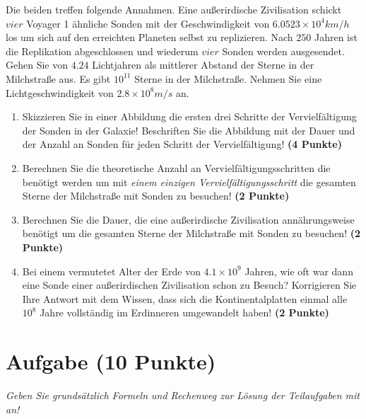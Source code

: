 \documentclass[a4paper, 9pt]{scrartcl}\usepackage[]{graphicx}\usepackage[]{xcolor}
\begin{document}
Die beiden treffen folgende Annahmen. Eine außerirdische Zivilisation schickt $vier$ Voyager 1 ähnliche Sonden mit der Geschwindigkeit von $\ensuremath{6.0523\times 10^{4}}km/h$ los um sich auf den erreichten Planeten selbst zu replizieren. Nach $250$ Jahren ist die Replikation abgeschlossen und wiederum $vier$ Sonden werden ausgesendet. Gehen Sie von $4.24$ Lichtjahren als mittlerer Abstand der Sterne in der Milchstraße aus. Es gibt $\ensuremath{10^{11}}$ Sterne in der Milchstraße. Nehmen Sie eine Lichtgeschwindigkeit von $\ensuremath{2.8\times 10^{8}}m/s$ an.

\begin{enumerate}
\item Skizzieren Sie in einer Abbildung die ersten drei Schritte der Vervielfältigung der Sonden in der Galaxie! Beschriften Sie die Abbildung mit der Dauer und der Anzahl an Sonden für jeden Schritt der Vervielfältigung! \textbf{(4 Punkte)}
\item Berechnen Sie die theoretische Anzahl an Vervielfältigungsschritten die benötigt werden um mit \textit{einem einzigen Vervielfältigungsschritt} die gesamten Sterne der Milchstraße mit Sonden zu besuchen! \textbf{(2 Punkte)}
\item Berechnen Sie die Dauer, die eine außerirdische Zivilisation annährungsweise benötigt um die gesamten Sterne der Milchstraße mit Sonden zu besuchen! \textbf{(2 Punkte)}
\item Bei einem vermutetet Alter der Erde von $\ensuremath{4.1\times 10^{9}}$ Jahren, wie oft war dann eine Sonde einer außerirdischen Zivilisation schon zu Besuch? Korrigieren Sie Ihre Antwort mit dem Wissen, dass sich die Kontinentalplatten einmal alle $\ensuremath{10^{8}}$ Jahre vollständig im Erdinneren umgewandelt haben! \textbf{(2 Punkte)}
\end{enumerate}


 
\clearpage

\section{Aufgabe \hfill (10 Punkte)}

\textit{Geben Sie grundsätzlich Formeln und Rechenweg zur Lösung der Teilaufgaben mit an!} \\[1Ex]
 
\end{document}
